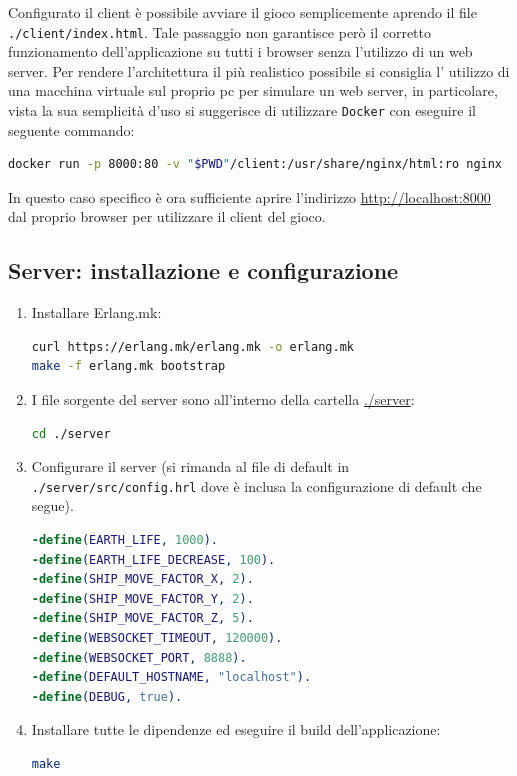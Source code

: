 \documentclass[paper=a4, fontsize=11pt]{scrartcl} %
\numberwithin{equation}{section} %
\numberwithin{figure}{section} %
\numberwithin{table}{section} %
\begin{document}
Configurato il client è possibile avviare il gioco semplicemente aprendo il file \texttt{./client/index.html}.
Tale passaggio non garantisce però il corretto funzionamento dell'applicazione su tutti i browser senza l'utilizzo di un web server.
Per rendere l'architettura il più realistico possibile si consiglia l' utilizzo di una macchina virtuale sul proprio pc per simulare un web server, in particolare, vista la sua semplicità d'uso
si suggerisce di utilizzare \texttt{Docker}\cite{docker} con eseguire il seguente commando:
\begin{lstlisting}[language=bash]
docker run -p 8000:80 -v "$PWD"/client:/usr/share/nginx/html:ro nginx
\end{lstlisting}
In questo caso specifico è ora sufficiente aprire l'indirizzo \url{http://localhost:8000} dal proprio browser per utilizzare il client del gioco.

\subsection{Server: installazione e configurazione}
\begin{enumerate}
\item
Installare Erlang.mk:
\begin{lstlisting}[language=bash]
curl https://erlang.mk/erlang.mk -o erlang.mk
make -f erlang.mk bootstrap
\end{lstlisting}

\item
I file sorgente del server sono all'interno della cartella \url{./server}:
\begin{lstlisting}[language=bash]
cd ./server
\end{lstlisting}

\item
Configurare il server (si rimanda al file di default in \texttt{./server/src/config.hrl} dove è inclusa la configurazione di default che segue).
\begin{lstlisting}[language=erlang]
-define(EARTH_LIFE, 1000).
-define(EARTH_LIFE_DECREASE, 100).
-define(SHIP_MOVE_FACTOR_X, 2).
-define(SHIP_MOVE_FACTOR_Y, 2).
-define(SHIP_MOVE_FACTOR_Z, 5).
-define(WEBSOCKET_TIMEOUT, 120000).
-define(WEBSOCKET_PORT, 8888).
-define(DEFAULT_HOSTNAME, "localhost").
-define(DEBUG, true).

\end{lstlisting}

\item
Installare tutte le dipendenze ed eseguire il build dell'applicazione:
\begin{lstlisting}[language=bash]
make
\end{lstlisting}
\end{enumerate}
\end{document}
